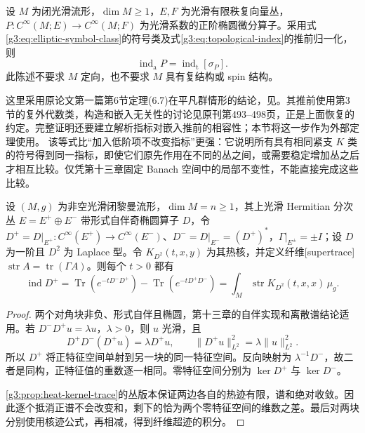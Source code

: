 \begin{theorem}\label{g3:thm:atiyah-singer-index}
	设 \(M\) 为闭光滑流形，\(\dim M\ge1\)，\(E,F\) 为光滑有限秩复向量丛，\(P:C^\infty(M;E)\to C^\infty(M;F)\) 为光滑系数的正阶椭圆微分算子。采用式\eqref{g3:eq:elliptic-symbol-class}的符号类及式\eqref{g3:eq:topological-index}的推前归一化，则
	\begin{equation}\label{g3:eq:atiyah-singer-index}
		\operatorname{ind}_{\mathrm a}P
		=\operatorname{ind}_{\mathrm t}[\sigma_P].
	\end{equation}
	此陈述不要求 \(M\) 定向，也不要求 \(M\) 具有复结构或 spin 结构。
\end{theorem}

这里采用原论文第一篇第6节定理(6.7)在平凡群情形的结论，见\cite[第520页]{AtiyahSinger1968I}。其推前使用第3节的复外代数类，构造和嵌入无关性的讨论见原刊第493--498页，正是上面恢复的约定。完整证明还要建立解析指标对嵌入推前的相容性；本节将这一步作为外部定理使用。
\ProseParagraphBreak
该等式比“加入低阶项不改变指标”更强：它说明所有具有相同紧支 \(K\) 类的符号得到同一指标，即使它们原先作用在不同的丛之间，或需要稳定增加丛之后才相互比较。仅凭第十三章固定 Banach 空间中的局部不变性，不能直接完成这些比较。

\begin{proposition}\label{g3:prop:graded-heat-index}
	设 \((M,g)\) 为非空光滑闭黎曼流形，\(\dim M=n\ge1\)，其上光滑 Hermitian 分次丛 \(E=E^+\oplus E^-\) 带形式自伴奇椭圆算子 \(D\)，令 \(D^+=D|_{E^+}:C^\infty(E^+)\to C^\infty(E^-)\)、\(D^-=D|_{E^-}=(D^+)^*\)，\(\Gamma|_{E^\pm}=\pm I\)；设 \(D\) 为一阶且 \(D^2\) 为 Laplace 型。令 \(K_{D^2}(t,x,y)\) 为其热核，并定义纤维[supertrace]
	\(\operatorname{str}A=\operatorname{tr}(\Gamma A)\)。则每个 \(t>0\) 都有
	\begin{equation}\label{g3:eq:graded-heat-index}
		\operatorname{ind}D^+
		=\operatorname{Tr}(e^{-tD^-D^+})
		-\operatorname{Tr}(e^{-tD^+D^-})
		=\int_M\operatorname{str}K_{D^2}(t,x,x)\,\mu_g.
	\end{equation}
\end{proposition}
\begin{proof}
	两个对角块非负、形式自伴且椭圆，第十三章的自伴实现和离散谱结论适用。若
	\(D^-D^+u=\lambda u\)，\(\lambda>0\)，则 \(u\) 光滑，且
	\[
		D^+D^-(D^+u)=\lambda D^+u,
		\qquad
		\lVert D^+u\rVert_{L^2}^2=\lambda\lVert u\rVert_{L^2}^2.
	\]
	所以 \(D^+\) 将正特征空间单射到另一块的同一特征空间。反向映射为 \(\lambda^{-1}D^-\)，故二者是同构，正特征值的重数逐一相同。零特征空间分别为 \(\ker D^+\) 与 \(\ker D^-\)。

	\cref{g3:prop:heat-kernel-trace}的丛版本保证两边各自的热迹有限，谱和绝对收敛。因此逐个抵消正谱不会改变和，剩下的恰为两个零特征空间的维数之差。最后对两块分别使用核迹公式，再相减，得到纤维超迹的积分。
\end{proof}

